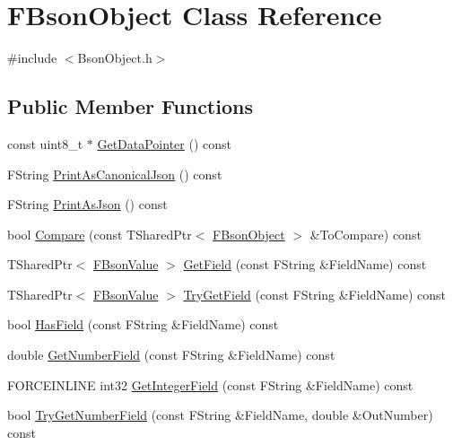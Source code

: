 \hypertarget{class_f_bson_object}{}\section{F\+Bson\+Object Class Reference}
\label{class_f_bson_object}


{\ttfamily \#include $<$Bson\+Object.\+h$>$}

\subsection*{Public Member Functions}
\begin{DoxyCompactItemize}
\item 
const uint8\+\_\+t $\ast$ \mbox{\hyperlink{class_f_bson_object_af012a0438b3e430efed8dc4f1bcd1de7}{Get\+Data\+Pointer}} () const
\item 
F\+String \mbox{\hyperlink{class_f_bson_object_a8d8d23a9c2887b98a115dcb59ec4d8e2}{Print\+As\+Canonical\+Json}} () const
\item 
F\+String \mbox{\hyperlink{class_f_bson_object_abe06191c8b6df93b07fd66d582194608}{Print\+As\+Json}} () const
\item 
bool \mbox{\hyperlink{class_f_bson_object_a33c96802fcc2f7267a2d9b4c315b751c}{Compare}} (const T\+Shared\+Ptr$<$ \mbox{\hyperlink{class_f_bson_object}{F\+Bson\+Object}} $>$ \&To\+Compare) const
\item 
T\+Shared\+Ptr$<$ \mbox{\hyperlink{class_f_bson_value}{F\+Bson\+Value}} $>$ \mbox{\hyperlink{class_f_bson_object_a8f5c19b16e114fb51789313da65ee438}{Get\+Field}} (const F\+String \&Field\+Name) const
\item 
T\+Shared\+Ptr$<$ \mbox{\hyperlink{class_f_bson_value}{F\+Bson\+Value}} $>$ \mbox{\hyperlink{class_f_bson_object_ab6df900d2da6d850cac67bfb48862b22}{Try\+Get\+Field}} (const F\+String \&Field\+Name) const
\item 
bool \mbox{\hyperlink{class_f_bson_object_a9d47685e9b2f59df92ccfe1351a49e68}{Has\+Field}} (const F\+String \&Field\+Name) const
\item 
double \mbox{\hyperlink{class_f_bson_object_ac2eb24afb362e7adeffd25295926e309}{Get\+Number\+Field}} (const F\+String \&Field\+Name) const
\item 
F\+O\+R\+C\+E\+I\+N\+L\+I\+NE int32 \mbox{\hyperlink{class_f_bson_object_a9560d742bc657aeb7439de7b5b378bc2}{Get\+Integer\+Field}} (const F\+String \&Field\+Name) const
\item 
bool \mbox{\hyperlink{class_f_bson_object_a1b1e5ef9cc72a00a8e3d246f7bed7842}{Try\+Get\+Number\+Field}} (const F\+String \&Field\+Name, double \&Out\+Number) const

\end{DoxyCompactItemize}
